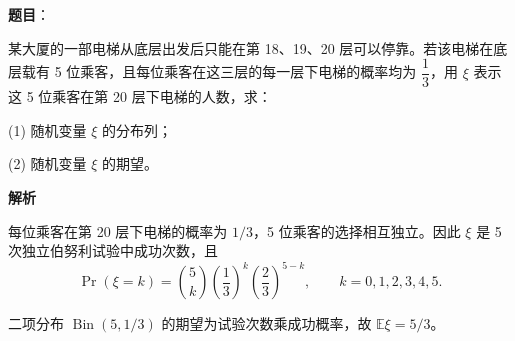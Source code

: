 \begin{answer}

\textbf{题目}：

某大厦的一部电梯从底层出发后只能在第 18、19、20 层可以停靠。若该电梯在底层载有 5 位乘客，且每位乘客在这三层的每一层下电梯的概率均为 \(\dfrac13\)，用 \(\xi\) 表示这 5 位乘客在第 20 层下电梯的人数，求：

(1) 随机变量 \(\xi\) 的分布列；

(2) 随机变量 \(\xi\) 的期望。

\textbf{解析}


每位乘客在第 20 层下电梯的概率为 \(1/3\)，5 位乘客的选择相互独立。因此 \(\xi\) 是 5 次独立伯努利试验中成功次数，且
\nopagebreak[4]
\[
\Pr(\xi=k)=\binom5k\left(\frac13\right)^k\left(\frac23\right)^{5-k},\qquad k=0,1,2,3,4,5.
\]


二项分布 \(\operatorname{Bin}(5,1/3)\) 的期望为试验次数乘成功概率，故 \(\mathbb E\xi=5/3\)。



\end{answer}
